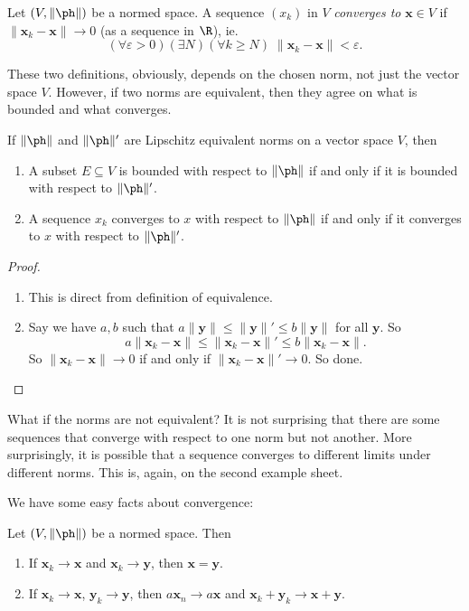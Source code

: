 \documentclass[a4paper]{article}
\begin{document}
\begin{defi}
  Let $(V, \|\ph\|)$ be a normed space. A sequence $(x_k)$ in $V$ \emph{converges to} $\mathbf{x} \in V$ if $\|\mathbf{x}_k - \mathbf{x}\| \to 0$ (as a sequence in $\R$), ie.
  \[
    (\forall \varepsilon > 0)(\exists N)(\forall k \geq N)\; \|\mathbf{x}_k - \mathbf{x}\| < \varepsilon.
  \]
\end{defi}
These two definitions, obviously, depends on the chosen norm, not just the vector space $V$. However, if two norms are equivalent, then they agree on what is bounded and what converges.
\begin{prop}
  If $\|\ph \|$ and $\|\ph \|'$ are Lipschitz equivalent norms on a vector space $V$, then
  \begin{enumerate}
    \item A subset $E\subseteq V$ is bounded with respect to $\|\ph \|$ if and only if it is bounded with respect to $\|\ph \|'$.
    \item A sequence $x_k$ converges to $x$ with respect to $\|\ph \|$ if and only if it converges to $x$ with respect to $\|\ph \|'$.
  \end{enumerate}
\end{prop}

\begin{proof}\leavevmode
  \begin{enumerate}
    \item This is direct from definition of equivalence.
    \item Say we have $a, b$ such that $a\|\mathbf{y}\| \leq \|\mathbf{y}\|' \leq b\|\mathbf{y}\|$ for all $\mathbf{y}$. So
      \[
        a\|\mathbf{x}_k - \mathbf{x}\| \leq \|\mathbf{x}_k - \mathbf{x}\|' \leq b\|\mathbf{x}_k - \mathbf{x}\|.
      \]
      So $\|\mathbf{x}_k - \mathbf{x}\| \to 0$ if and only if $\|\mathbf{x}_k - \mathbf{x}\|' \to 0$. So done.
  \end{enumerate}
\end{proof}
What if the norms are not equivalent? It is not surprising that there are some sequences that converge with respect to one norm but not another. More surprisingly, it is possible that a sequence converges to different limits under different norms. This is, again, on the second example sheet.

We have some easy facts about convergence:
\begin{prop}
  Let $(V, \|\ph \|)$ be a normed space. Then
  \begin{enumerate}
    \item If $\mathbf{x}_k \to \mathbf{x}$ and $\mathbf{x}_k \to \mathbf{y}$, then $\mathbf{x} = \mathbf{y}$.
    \item If $\mathbf{x}_k \to \mathbf{x}$, $\mathbf{y}_k \to \mathbf{y}$, then $a\mathbf{x}_n \to a\mathbf{x}$ and $\mathbf{x}_k + \mathbf{y}_k \to \mathbf{x} + \mathbf{y}$.
  \end{enumerate}
\end{prop}
\end{document}
